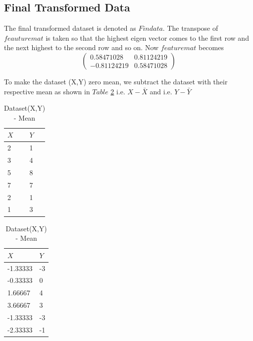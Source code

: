 \documentclass[a4paper]{article}
\begin{document}
\subsection{Final Transformed Data}

The final transformed dataset is denoted as $Findata$.
The transpose of $feauturemat$ is taken so that the highest eigen vector comes to the first row and the next highest to the second row and so on.
Now $featuremat$ becomes
$$\begin{pmatrix}  0.58471028 & 0.81124219\\   -0.81124219 & 0.58471028 \end{pmatrix}$$

To make the dataset (X,Y) zero mean, we subtract the dataset with their respective mean as shown in $Table$ \ref{table1}
i.e. $X-\bar{X}$ and i.e. $Y-\bar{Y}$
\begin{table}[!htb]
    \begin{minipage}{.5\linewidth}
      \caption{Dataset (X,Y)}
      \centering
        \begin{tabular}{ll}
            $X$ & $Y$ \\ \hline
2 & 1 \\
3 & 4 \\
5 & 8 \\
7 & 7 \\
2 & 1 \\
1 & 3 
        \end{tabular}
    \end{minipage}%
    \begin{minipage}{.5\linewidth}
      \centering
        \caption{Dataset(X,Y) - Mean}\label{table1}
        \begin{tabular}{ll}
           $X$ & $Y$ \\ \hline
-1.33333 & -3 \\
-0.33333 & 0 \\
1.66667 & 4 \\
3.66667 & 3 \\
-1.33333 & -3 \\
-2.33333 & -1 
        \end{tabular}
    \end{minipage} 
\end{table}
\end{document}
